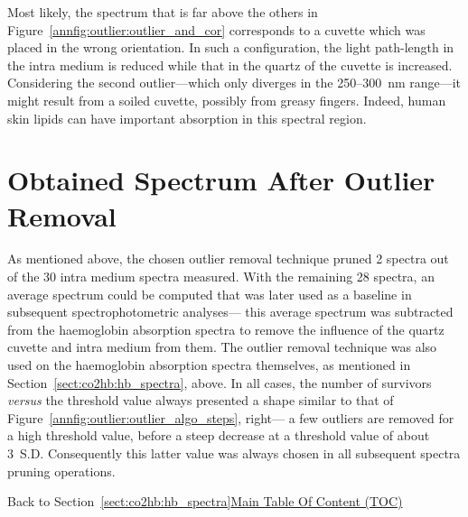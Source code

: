 Most likely, the spectrum that is far above the others in Figure~\ref{annfig:outlier:outlier_and_cor} corresponds to a cuvette which was placed in the wrong orientation. In such a configuration, the light path-length in the intra medium is reduced while that in the quartz of the cuvette is increased. Considering the second outlier---which only diverges in the 250--300~nm range---it might result from a soiled cuvette, possibly from greasy fingers. Indeed, human skin lipids can have important absorption in this spectral region\cite{beadle1981}.

\section{Obtained Spectrum After Outlier Removal}

As mentioned above, the chosen outlier removal technique pruned 2 spectra out of the 30 intra medium spectra measured. With the remaining 28 spectra, an average spectrum could be computed that was later used as a baseline in subsequent spectrophotometric analyses---\ie{} this average spectrum was subtracted from the haemoglobin absorption spectra to remove the influence of the quartz cuvette and intra medium from them. The outlier removal technique was also used on the haemoglobin absorption spectra themselves, as mentioned in Section~\ref{sect:co2hb:hb_spectra}, above. In all cases, the number of survivors \textit{versus} the threshold value always presented a shape similar to that of Figure~\ref{annfig:outlier:outlier_algo_steps}, right---\ie{} a few outliers are removed for a high threshold value, before a steep decrease at a threshold value of about 3~S.D. Consequently this latter value was always chosen in all subsequent spectra pruning operations.

\begin{appbox}
	Back to Section~\ref{sect:co2hb:hb_spectra}\hfill \hyperref[chapter:toc]{Main Table Of Content (TOC)}
\end{appbox}